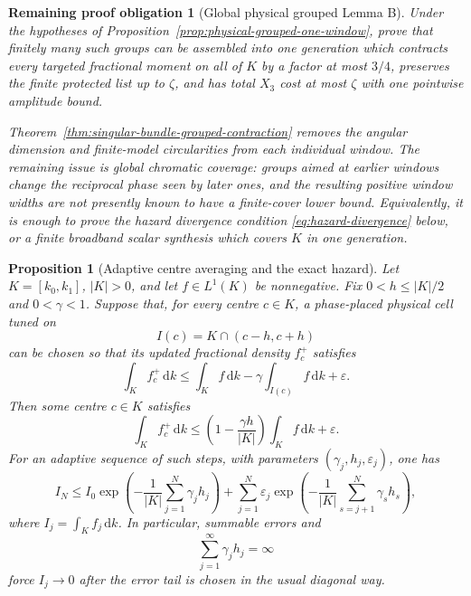 \documentclass[11pt]{article}
\newtheorem{proposition}[theorem]{Proposition}
\newtheorem{problem}[theorem]{Remaining proof obligation}
\theoremstyle{remark}
\newcommand{\dd}{\,\mathrm d}
\begin{document}
\begin{problem}[Global physical grouped Lemma B]
\label{prob:physical-grouped-global}
Under the hypotheses of Proposition~\ref{prop:physical-grouped-one-window},
prove that finitely many such groups can be assembled into one generation
which contracts every targeted fractional moment on all of $K$ by a factor at
most $3/4$, preserves the finite protected list up to $\zeta$, and has total
$X_3$ cost at most $\zeta$ with one pointwise amplitude bound.

Theorem~\ref{thm:singular-bundle-grouped-contraction} removes the angular
dimension and finite-model circularities from each individual window.  The
remaining issue is global chromatic coverage: groups aimed at earlier windows
change the reciprocal phase seen by later ones, and the resulting positive
window widths are not presently known to have a finite-cover lower bound.
Equivalently, it is enough to prove the hazard divergence condition
\eqref{eq:hazard-divergence} below, or a finite broadband scalar synthesis
which covers $K$ in one generation.
\end{problem}

\begin{proposition}[Adaptive centre averaging and the exact hazard]
\label{prop:adaptive-centre-averaging}
Let $K=[k_0,k_1]$, $|K|>0$, and let $f\in L^1(K)$ be nonnegative.  Fix
$0<h\leq |K|/2$ and $0<\gamma<1$.  Suppose that, for every centre
$c\in K$, a phase-placed physical cell tuned on
\[
 I(c)=K\cap(c-h,c+h)
\]
can be chosen so that its updated fractional density $f_c^+$ satisfies
\begin{equation}
 \int_K f_c^+\dd k
 \leq \int_K f\dd k
       -\gamma\int_{I(c)}f\dd k+\varepsilon.
 \label{eq:one-centre-gain}
\end{equation}
Then some centre $c\in K$ satisfies
\begin{equation}
 \int_K f_c^+\dd k
 \leq
 \left(1-\frac{\gamma h}{|K|}\right)
 \int_K f\dd k+\varepsilon.
 \label{eq:adaptive-hazard-step}
\end{equation}
For an adaptive sequence of such steps, with parameters
$(\gamma_j,h_j,\varepsilon_j)$, one has
\begin{equation}
 I_N\leq I_0
  \exp\!\left(-\frac1{|K|}\sum_{j=1}^N\gamma_jh_j\right)
 +\sum_{j=1}^N\varepsilon_j
   \exp\!\left(-\frac1{|K|}
     \sum_{s=j+1}^N\gamma_sh_s\right),
 \label{eq:hazard-product-bound}
\end{equation}
where $I_j=\int_K f_j\dd k$.  In particular, summable errors and
\begin{equation}
 \sum_{j=1}^\infty\gamma_jh_j=\infty
 \label{eq:hazard-divergence}
\end{equation}
force $I_j\to0$ after the error tail is chosen in the usual diagonal way.
\end{proposition}
\end{document}
